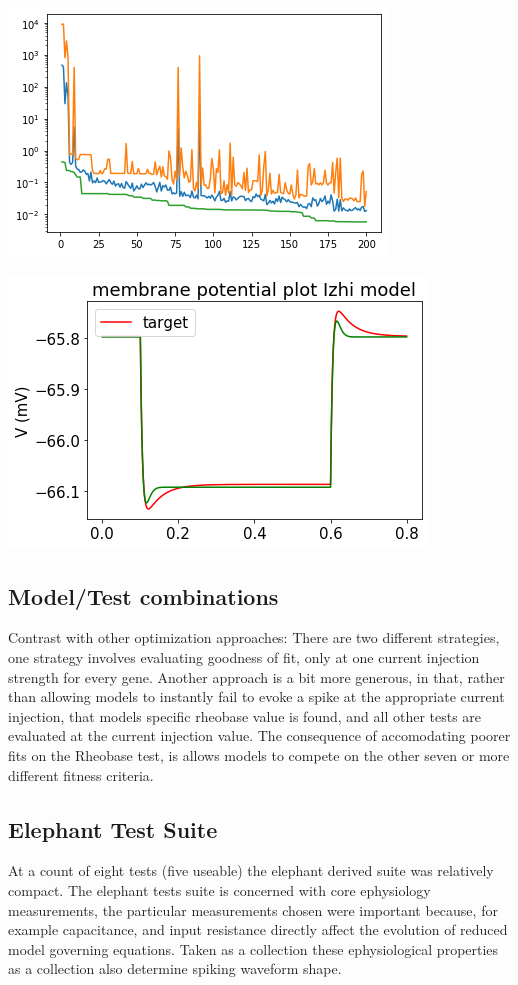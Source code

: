 \includegraphics[]{figures/simulated_convergence_performance.png}

\includegraphics[]{figures/simulated_data_convergence_passive_fits.png}

\subsection{Model/Test combinations}

Contrast with other optimization approaches:
There are two different strategies, one strategy involves evaluating goodness of fit, only at one current injection strength for every gene. Another approach is a bit more generous, in that, rather than allowing models to instantly fail to evoke a spike at the appropriate current injection, that models specific rheobase value is found, and all other tests are evaluated at the current injection value. The consequence of accomodating poorer fits on the Rheobase test, is allows models to compete on the other seven or more different fitness criteria.

\subsection{Elephant Test Suite}
At a count of eight tests (five useable) the elephant derived suite was relatively compact. The elephant tests suite is concerned with core ephysiology measurements, the particular measurements chosen were important because, for example capacitance, and input resistance directly affect the evolution of reduced model governing equations. Taken as a collection these ephysiological properties as a collection also determine spiking waveform shape. 

